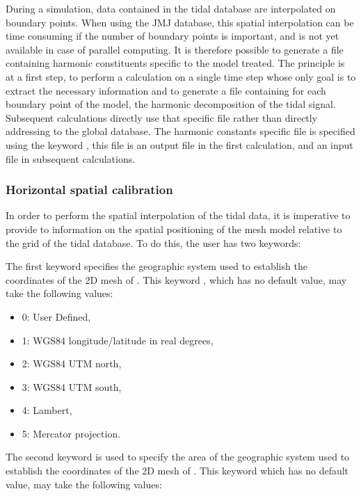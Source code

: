 During a simulation, data contained in the tidal database are interpolated on
boundary points. When using the JMJ database, this spatial interpolation can
be time consuming if the number of boundary points is important, and is not yet
available in case of parallel computing. It is therefore possible to generate a
file containing harmonic constituents specific to the model treated. The
principle is at a first step, to perform a calculation on a single time step
whose only goal is to extract the necessary information and to generate a file
containing for each boundary point of the model, the harmonic decomposition of
the tidal signal. Subsequent calculations directly use that specific file
rather than directly addressing to the global database. The harmonic constants
specific file is specified using the keyword ,
this file is an output file in the first calculation, and an input file in
subsequent calculations.


\subsubsection{Horizontal spatial calibration}

In order to perform the spatial interpolation of the tidal data, it is
imperative to provide to  information on the spatial positioning of
the mesh model relative to the grid of the tidal database. To do this, the user
has two keywords:

The first keyword specifies the geographic system used to establish the
coordinates of the 2D mesh of . This keyword , which has no default value, may take the following values:

\begin{itemize}
\item 0: User Defined,

\item 1: WGS84 longitude/latitude in real degrees,

\item 2: WGS84 UTM north,

\item 3: WGS84 UTM south,

\item 4: Lambert,

\item 5: Mercator projection.
\end{itemize}

The second keyword is used to specify the area of the geographic system used to
establish the coordinates of the 2D mesh of . This keyword
 which has no default value, may take
the following values:

